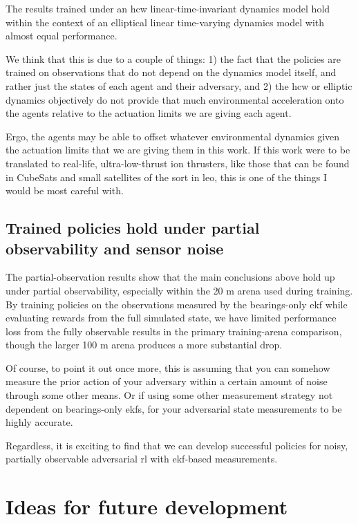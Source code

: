The results trained under an \acs{hcw} linear-time-invariant dynamics model hold within the context of an elliptical linear time-varying dynamics model with almost equal performance. 

We think that this is due to a couple of things: 1) the fact that the policies are trained on observations that do not depend on the dynamics model itself, and rather just the states of each agent and their adversary, and 2) the \acs{hcw} or elliptic dynamics objectively do not provide that much environmental acceleration onto the agents relative to the actuation limits we are giving each agent.

Ergo, the agents may be able to offset whatever environmental dynamics given the actuation limits that we are giving them in this work. If this work were to be translated to real-life, ultra-low-thrust ion thrusters, like those that can be found in CubeSats and small satellites of the sort in \acs{leo}, this is one of the things I would be most careful with.


\subsection*{Trained policies hold under partial observability and sensor noise}

The partial-observation results show that the main conclusions above hold up under partial observability, especially within the 20 m arena used during training. By training policies on the observations measured by the bearings-only \acs{ekf} while evaluating rewards from the full simulated state, we have limited performance loss from the fully observable results in the primary training-arena comparison, though the larger 100 m arena produces a more substantial drop.

Of course, to point it out once more, this is assuming that you can somehow measure the prior action of your adversary within a certain amount of noise through some other means. Or if using some other measurement strategy not dependent on bearings-only \acs{ekf}s, for your adversarial state measurements to be highly accurate.


Regardless, it is exciting to find that we can develop successful policies for noisy, partially observable adversarial \acs{rl} with \acs{ekf}-based measurements.


\section{Ideas for future development}
\label{sec:future-development}

